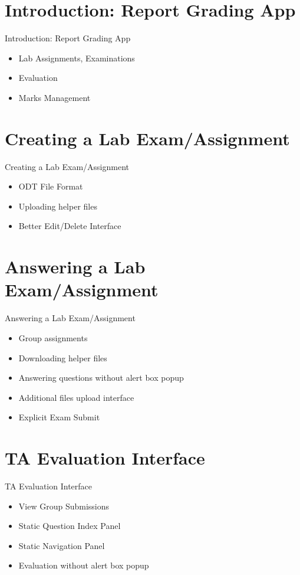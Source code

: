 \section{Introduction: Report Grading App}
\begin{frame}{Introduction: Report Grading App}
	\begin{itemize}
		\item Lab Assignments, Examinations
		\item Evaluation
		\item Marks Management
	\end{itemize}
\end{frame}

\section{Creating a Lab Exam/Assignment}
\begin{frame}{Creating a Lab Exam/Assignment}
	\begin{itemize}
		\item ODT File Format
		\item Uploading helper files
		\item Better Edit/Delete Interface
	\end{itemize}
\end{frame}

\section{Answering a Lab Exam/Assignment}
\begin{frame}{Answering a Lab Exam/Assignment}
	\begin{itemize}
		\item Group assignments
		\item Downloading helper files
		\item Answering questions without alert box popup
		\item Additional files upload interface
		\item Explicit Exam Submit
	\end{itemize}
\end{frame}

\section{TA Evaluation Interface}
\begin{frame}{TA Evaluation Interface}
	\begin{itemize}
		\item View Group Submissions
		\item Static Question Index Panel
		\item Static Navigation Panel
		\item Evaluation without alert box popup
	\end{itemize}
\end{frame}
